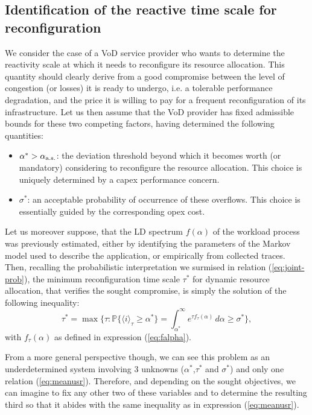 \documentclass[twoside]{article}
\begin{document}
\subsection{Identification of the reactive time scale for reconfiguration}
\label{sec:scale}

We consider the case of a VoD service provider who wants to determine the reactivity scale at which it needs to reconfigure its resource allocation. This quantity should clearly derive from a good compromise between the level of congestion (or losses) it is ready to undergo, i.e. a tolerable performance  degradation, and the price it is willing to pay for a frequent reconfiguration of its infrastructure. Let us then assume that the VoD provider has fixed admissible bounds for these two competing factors, having determined the following quantities:
\begin{itemize}
\item $\alpha^* > \alpha_{\rm a.s.}$: the deviation threshold  beyond which it becomes worth (or mandatory) considering to reconfigure the resource allocation. This choice is uniquely determined by a {\sc capex} performance concern. 
\item $\sigma^*$: an acceptable probability of occurrence of these overflows. This choice is essentially guided by the corresponding {\sc opex} cost.
\end{itemize}

Let us moreover suppose, that the LD spectrum $f(\alpha)$ of the workload process was previously estimated, either by identifying the parameters of the Markov model used to describe the application, or empirically from collected traces. Then, recalling the probabilistic interpretation we surmised in relation (\ref{eq:joint-prob}), the minimum reconfiguration time scale $\tau^*$ for dynamic resource allocation, that verifies the sought compromise, is simply the solution of the following inequality:
\begin{equation}
\tau^* = \max\{\tau : \mathbb{P}{\{ \langle i \rangle_{\tau} \geq \alpha^* \} }  =  \int^\infty_{\alpha^*} e^{\tau f_{\tau}(\alpha)}\,d{\alpha}  \geq \sigma^*\},
\label{eq:meanusr}
\end{equation}
with $f_{\tau}(\alpha)$ as defined in expression (\ref{eq:falpha}).

From a more general perspective though, we can see this problem as an underdetermined system involving 3 unknowns ($\alpha^*$,$ \tau^*$ and $\sigma^*$) and only one relation (\ref{eq:meanusr}). Therefore, and depending on the sought objectives, we can imagine to fix any other two of these variables and to determine the resulting third so that it abides with the same inequality as in expression (\ref{eq:meanusr}). 
\end{document}
